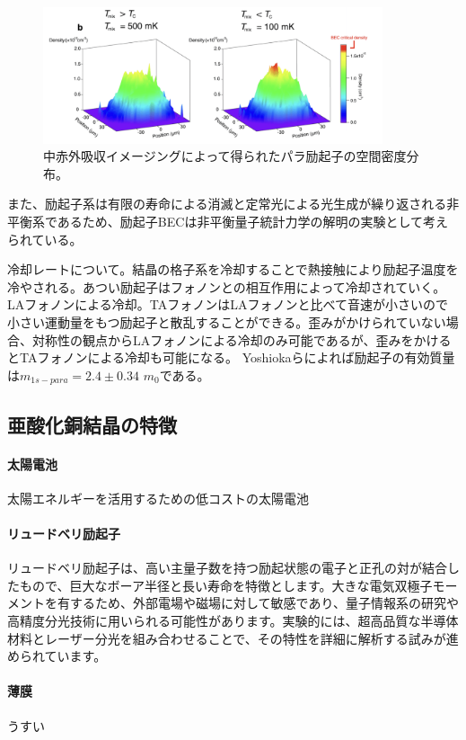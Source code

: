 \begin{figure}[htbp]
\begin{center}
\includegraphics[width=100mm]{Screenshoot_2024-08-16_4.31.11.png}
\caption{中赤外吸収イメージングによって得られたパラ励起子の空間密度分布。}
\end{center}
\end{figure}


また、励起子系は有限の寿命による消滅と定常光による光生成が繰り返される非平衡系であるため、励起子BECは非平衡量子統計力学の解明の実験として考えられている。

冷却レートについて。結晶の格子系を冷却することで熱接触により励起子温度を冷やされる。あつい励起子はフォノンとの相互作用によって冷却されていく。LAフォノンによる冷却。TAフォノンはLAフォノンと比べて音速が小さいので小さい運動量をもつ励起子と散乱することができる。歪みがかけられていない場合、対称性の観点からLAフォノンによる冷却のみ可能であるが、歪みをかけるとTAフォノンによる冷却も可能になる。
Yoshiokaらによれば励起子の有効質量は$m_{1s-para} = 2.4\pm0.34$ $m_{0}$である。
\subsection{亜酸化銅結晶の特徴}
\paragraph{太陽電池}
太陽エネルギーを活用するための低コストの太陽電池

\paragraph{リュードベリ励起子}
リュードベリ励起子は、高い主量子数を持つ励起状態の電子と正孔の対が結合したもので、巨大なボーア半径と長い寿命を特徴とします。大きな電気双極子モーメントを有するため、外部電場や磁場に対して敏感であり、量子情報系の研究や高精度分光技術に用いられる可能性があります。実験的には、超高品質な半導体材料とレーザー分光を組み合わせることで、その特性を詳細に解析する試みが進められています。

\paragraph{薄膜}
うすい
\newpage
